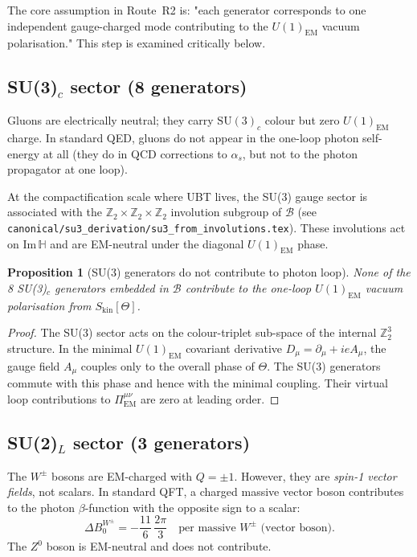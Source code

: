 \documentclass[12pt,a4paper]{article}
\newtheorem{proposition}[theorem]{Proposition}
\theoremstyle{remark}
\begin{document}
The core assumption in Route~R2 is: "each generator corresponds to one
independent gauge-charged mode contributing to the $U(1)_{\mathrm{EM}}$
vacuum polarisation."  This step is examined critically below.

\subsection{SU(3)$_c$ sector (8 generators)}

Gluons are electrically neutral; they carry $\mathrm{SU}(3)_c$ colour but
zero $U(1)_{\mathrm{EM}}$ charge.  In standard QED, gluons do not appear
in the one-loop photon self-energy at all (they do in QCD corrections to
$\alpha_s$, but not to the photon propagator at one loop).

At the compactification scale where UBT lives, the SU(3) gauge sector
is associated with the $\mathbb{Z}_2\times\mathbb{Z}_2\times\mathbb{Z}_2$
involution subgroup of $\mathcal{B}$ (see
\texttt{canonical/su3\_derivation/su3\_from\_involutions.tex}).  These
involutions act on $\mathrm{Im}\,\mathbb{H}$ and are EM-neutral under the
diagonal $U(1)_{\mathrm{EM}}$ phase.

\begin{proposition}[SU(3) generators do not contribute to photon loop]
\label{prop:SU3}
None of the 8 SU(3)$_c$ generators embedded in $\mathcal{B}$ contribute
to the one-loop $U(1)_{\mathrm{EM}}$ vacuum polarisation from
$S_{\mathrm{kin}}[\Theta]$.
\end{proposition}

\begin{proof}
The SU(3) sector acts on the colour-triplet sub-space of the internal
$\mathbb{Z}_2^3$ structure.  In the minimal $U(1)_{\mathrm{EM}}$
covariant derivative $D_\mu = \partial_\mu + ieA_\mu$, the gauge field
$A_\mu$ couples only to the overall phase of $\Theta$.  The SU(3)
generators commute with this phase and hence with the minimal coupling.
Their virtual loop contributions to $\Pi^{\mu\nu}_{\mathrm{EM}}$ are zero
at leading order.
\end{proof}

\subsection{SU(2)$_L$ sector (3 generators)}

The $W^{\pm}$ bosons are EM-charged with $Q = \pm 1$.  However, they are
\emph{spin-1 vector fields}, not scalars.  In standard QFT, a charged
massive vector boson contributes to the photon $\beta$-function with the
opposite sign to a scalar:
\begin{equation}
  \Delta B_0^{W^\pm} = -\frac{11}{6}\,\frac{2\pi}{3}
  \quad\text{per massive }W^\pm\text{ (vector boson)}.
  \label{eq:W_contribution}
\end{equation}
The $Z^0$ boson is EM-neutral and does not contribute.
\end{document}
